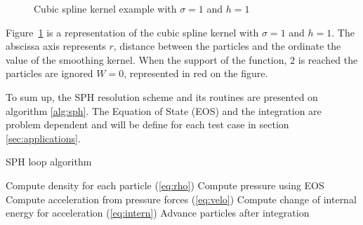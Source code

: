 \begin{figure}[t!]
\centering
{}
\caption{Cubic spline kernel example with $\sigma = 1$ and $h = 1$}
\label{fig:cubic_spline_function}
\end{figure}

Figure~\ref{fig:cubic_spline_function} is a representation of the cubic spline kernel with $\sigma = 1$ and $h = 1$. 
The abscissa axis represents $r$, distance between the particles and the ordinate the value of the smoothing kernel.
When the support of the function, $2$ is reached the particles are ignored $W=0$, represented in red on the figure. 

To sum up, the SPH resolution scheme and its routines are presented on algorithm \ref{alg:sph}.
The Equation of State (EOS) and the integration are problem dependent and will be define for each test case in section \ref{sec:applications}. 

\begin{algorithm}
\caption{SPH loop algorithm}\label{alg:sph}
\begin{algorithmic}[1]
\State Compute density for each particle (\ref{eq:rho})
\State Compute pressure using EOS 
\State Compute acceleration from pressure forces (\ref{eq:velo})
\State Compute change of internal energy for acceleration (\ref{eq:intern})
\State Advance particles after integration
\EndWhile
\end{algorithmic}
\end{algorithm}

